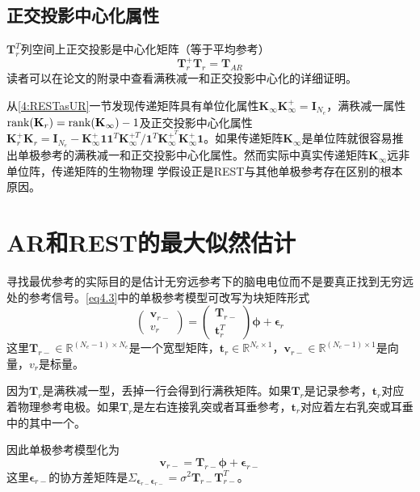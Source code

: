 \subsection{正交投影中心化属性} 
$\mathbf{T}_r^T$列空间上正交投影是中心化矩阵（等于平均参考）
\begin{equation}\label{eq4.14}
\mathbf{T}_r^+\mathbf{T}_r=\mathbf{T}_{AR}
\end{equation}
读者可以在论文的附录中查看满秩减一和正交投影中心化的详细证明。

从\ref{4:RESTasUR}一节发现传递矩阵具有单位化属性$\mathbf{K}_{\infty}\mathbf{K}_{\infty}^+=\mathbf{I}_{N_e}$，满秩减一属性$\operatorname{rank}(\mathbf{K}_r)=\operatorname{rank}(\mathbf{K}_{\infty})-1$及正交投影中心化属性$\mathbf{K}_r^+\mathbf{K}_r=\mathbf{I}_{N_e}-\mathbf{K}_{\infty}^+\mathbf{11}^T\mathbf{K}_{\infty}^{+T}/{\mathbf{1}^T\mathbf{K}_{\infty}^{+^T}\mathbf{K}_{\infty}^+\mathbf{1}}$。如果传递矩阵$\mathbf{K}_{\infty}$是单位阵就很容易推出单极参考的满秩减一和正交投影中心化属性。然而实际中真实传递矩阵$\mathbf{K}_{\infty}$远非单位阵，传递矩阵的生物物理
学假设正是REST与其他单极参考存在区别的根本原因。

\section{AR和REST的最大似然估计}
寻找最优参考的实际目的是估计无穷远参考下的脑电电位而不是要真正找到无穷远处的参考信号。\eqref{eq4.3}中的单极参考模型可改写为块矩阵形式
\begin{equation}\label{eq4.15}
\begin{pmatrix}\mathbf{v}_{r-}\\v_r\end{pmatrix}=\begin{pmatrix}\mathbf{T}_{r-}\\\mathbf{t}_r^T\end{pmatrix}\mathbf{\phi}+\mathbf{\epsilon}_r
\end{equation}
这里$\mathbf{T}_{r-}\in\mathbb{R}^{(N_e-1)\times{N_e}}$是一个宽型矩阵，$\mathbf{t}_r\in\mathbb{R}^{N_e\times1}$，$\mathbf{v}_{r-}\in\mathbb{R}^{(N_e-1)\times1}$是向量，$v_r$是标量。

因为$\mathbf{T}_r$是满秩减一型，丢掉一行会得到行满秩矩阵。如果$\mathbf{T}_r$是记录参考，$\mathbf{t}_r$对应着物理参考电极。如果$\mathbf{T}_r$是左右连接乳突或者耳垂参考，$\mathbf{t}_r$对应着左右乳突或耳垂中的其中一个。

因此单极参考模型化为
\begin{equation}\label{eq4.16}
\mathbf{v}_{r-}=\mathbf{T}_{r-}\mathbf{\phi}+\mathbf{\epsilon}_{r-}
\end{equation}
这里$\mathbf{\epsilon}_{r-}$的协方差矩阵是$\Sigma_{\mathbf{\epsilon}_{r-}\mathbf{\epsilon}_{r-}}=\sigma^2\mathbf{T}_{r-}\mathbf{T}_{r-}^T$。

